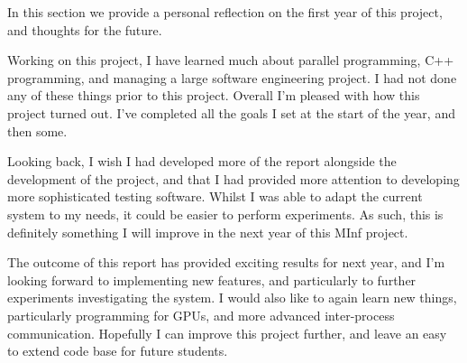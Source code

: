 In this section we provide a personal reflection on the first year of this project, and thoughts for the future.

Working on this project, I have learned much about parallel programming, C++ programming, and managing a large software engineering project. I had not done any of these things prior to this project. Overall I'm pleased with how this project turned out. I've completed all the goals I set at the start of the year, and then some.

Looking back, I wish I had developed more of the report alongside the development of the project, and that I had provided more attention to developing more sophisticated testing software. Whilst I was able to adapt the current system to my needs, it could be easier to perform experiments. As such, this is definitely something I will improve in the next year of this MInf project.

The outcome of this report has provided exciting results for next year, and I'm looking forward to implementing new features, and particularly to further experiments investigating the system. I would also like to again learn new things, particularly programming for GPUs, and more advanced inter-process communication. Hopefully I can improve this project further, and leave an easy to extend code base for future students.